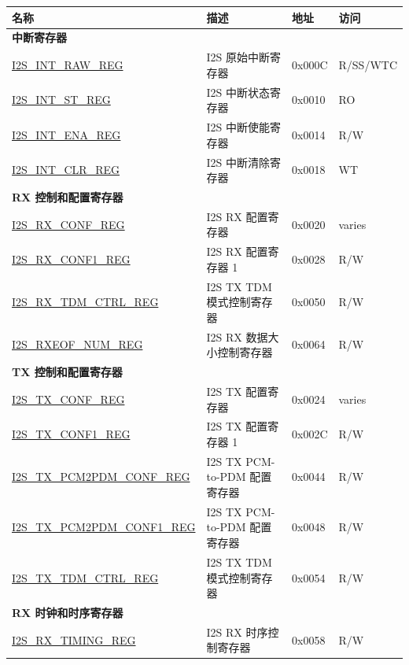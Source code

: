 \begin{longtable}{ | p{5.5cm} | p{7cm} | p{1.3cm} | p{2cm} | }
\hline\rowcolor{lightgray}
\textbf{名称} & \textbf{描述} &  \textbf{地址} & \textbf{访问} \\ \hline
\endhead
\multicolumn{4}{|l|}{\textbf{中断寄存器}} \\ \hline
\hyperref[regdesc:I2SINTRAWREG]{I2S\_INT\_RAW\_REG} & I2S 原始中断寄存器 & 0x000C & R/SS/WTC \\ \hline
\hyperref[regdesc:I2SINTSTREG]{I2S\_INT\_ST\_REG} & I2S 中断状态寄存器 & 0x0010 & RO \\ \hline
\hyperref[regdesc:I2SINTENAREG]{I2S\_INT\_ENA\_REG} & I2S 中断使能寄存器 & 0x0014 & R/W \\ \hline
\hyperref[regdesc:I2SINTCLRREG]{I2S\_INT\_CLR\_REG} & I2S 中断清除寄存器 & 0x0018 & WT \\ \hline
\multicolumn{4}{|l|}{\textbf{RX 控制和配置寄存器}} \\ \hline
\hyperref[regdesc:I2SRXCONFREG]{I2S\_RX\_CONF\_REG} & I2S RX 配置寄存器 & 0x0020 & varies \\ \hline
\hyperref[regdesc:I2SRXCONF1REG]{I2S\_RX\_CONF1\_REG} & I2S RX 配置寄存器 1 & 0x0028 & R/W \\ \hline
\hyperref[regdesc:I2SRXTDMCTRLREG]{I2S\_RX\_TDM\_CTRL\_REG} & I2S TX TDM 模式控制寄存器 & 0x0050 & R/W \\ \hline
\hyperref[regdesc:I2SRXEOFNUMREG]{I2S\_RXEOF\_NUM\_REG} & I2S RX 数据大小控制寄存器 & 0x0064 & R/W \\ \hline
\multicolumn{4}{|l|}{\textbf{TX 控制和配置寄存器}} \\ \hline
\hyperref[regdesc:I2STXCONFREG]{I2S\_TX\_CONF\_REG} & I2S TX 配置寄存器 & 0x0024 & varies \\ \hline
\hyperref[regdesc:I2STXCONF1REG]{I2S\_TX\_CONF1\_REG} & I2S TX 配置寄存器 1 & 0x002C & R/W \\ \hline
\hyperref[regdesc:I2STXPCM2PDMCONFREG]{I2S\_TX\_PCM2PDM\_CONF\_REG} & I2S TX PCM-to-PDM 配置寄存器 & 0x0044 & R/W \\ \hline
\hyperref[regdesc:I2STXPCM2PDMCONF1REG]{I2S\_TX\_PCM2PDM\_CONF1\_REG} & I2S TX PCM-to-PDM 配置寄存器 & 0x0048 & R/W \\ \hline
\hyperref[regdesc:I2STXTDMCTRLREG]{I2S\_TX\_TDM\_CTRL\_REG} & I2S TX TDM 模式控制寄存器 & 0x0054 & R/W \\ \hline
\multicolumn{4}{|l|}{\textbf{RX 时钟和时序寄存器}} \\ \hline
\hyperref[regdesc:I2SRXTIMINGREG]{I2S\_RX\_TIMING\_REG} & I2S RX 时序控制寄存器 & 0x0058 & R/W \\ \hline

\end{longtable}
